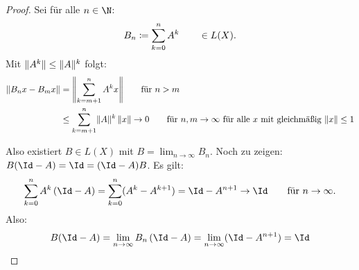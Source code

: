\begin{proof}
    Sei für alle $n\in\N$:
    \[ B_n \defeq \ksum[0]^n A^k \qquad\in L(X)  . \]
    Mit $\norm{A^k}\leq \norm{A}^k$ folgt:
    \begin{align*}
        \norm{B_n x - B_m x} &= \norm*{ \ksum[m+1]^n A^k x }
        \fuer n > m
        \\
        &\leq \ksum[m+1]^n \norm{A}^k \, \norm{x}
        \to 0 \fuer n,m\to\infty \text{ für alle $x$ mit 
            gleichmäßig $\norm{x}\leq 1$}
    \end{align*}
    
    Also existiert $B\in L(X)$ mit $B=\lim_{n\to\infty} B_n$.
    Noch zu zeigen: $B(\Id-A) = \Id = (\Id-A)B$. Es gilt:
    \[ \ksum[0]^n A^k\, (\Id-A) 
    = \ksum[0]^n (A^k-A^{k+1}) = \Id - A^{n+1} 
    \to \Id \fuer n\to\infty
    . \]
    Also:
    \[ B(\Id-A) = \lim_{n\to\infty} B_n \, (\Id-A)
        = \lim_{n\to\infty} (\Id-A^{n+1}) = \Id
    \]
\end{proof}







